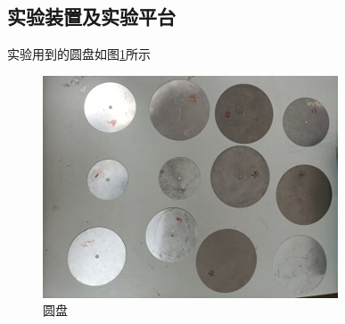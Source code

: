 \documentclass[UTF8]{gapd}
\begin{document}
\subsection{实验装置及实验平台}
实验用到的圆盘如图\ref{fig:unsinkable_disc_discs}所示
\begin{figure}[H]%
  \centering
  \includegraphics[width=0.8\columnwidth]{images/disc.jpg}
  \caption{圆盘}
  \label{fig:unsinkable_disc_discs}%
\end{figure}
\end{document}
